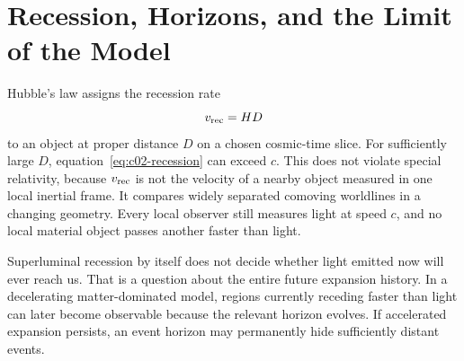 \section{Recession, Horizons, and the Limit of the Model}

Hubble's law assigns the recession rate
\begin{equation}
v_{\rm rec}=HD
\label{eq:c02-recession}
\end{equation}
to an object at proper distance \(D\) on a chosen cosmic-time slice. For sufficiently large \(D\), equation~\eqref{eq:c02-recession} can exceed \(c\). This does not violate special relativity, because \(v_{\rm rec}\) is not the velocity of a nearby object measured in one local inertial frame. It compares widely separated comoving worldlines in a changing geometry. Every local observer still measures light at speed \(c\), and no local material object passes another faster than light.

\begin{classroomqa}
\end{classroomqa}

Superluminal recession by itself does not decide whether light emitted now will ever reach us. That is a question about the entire future expansion history. In a decelerating matter-dominated model, regions currently receding faster than light can later become observable because the relevant horizon evolves. If accelerated expansion persists, an event horizon may permanently hide sufficiently distant events.

\begin{classroomqa}
\end{classroomqa}

